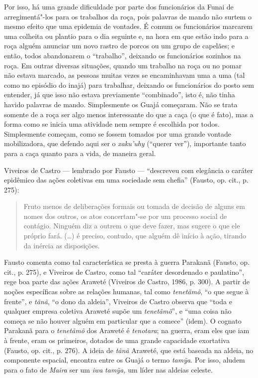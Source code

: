 Por isso, há uma grande dificuldade por parte dos funcionários da Funai
de arregimentá"-los para os trabalhos da roça, pois palavras de mando não
surtem o mesmo efeito que uma epidemia de vontades. É comum os
funcionários marcarem uma colheita ou plantio para o dia seguinte e, na
hora em que estão indo para a roça alguém anunciar um novo rastro de
porcos ou um grupo de capelães; e então, todos abandonarem o ``trabalho'',
deixando os funcionários sozinhos na roça. Em outras diversas situações,
quando um trabalho na roça ou no pomar não estava marcado, as pessoas
muitas vezes se encaminhavam uma a uma (tal como no episódio do inajá)
para trabalhar, deixando os funcionários do posto sem entender, já que
isso não estava previamente ``combinado'', isto é, não tinha havido
palavras de mando. Simplesmente os Guajá começaram. Não se trata somente
de a roça ser algo menos interessante do que a caça (o que é fato), mas
a forma como se inicia uma atividade nem sempre é escolhida por todos.
Simplesmente começam, como se fossem tomados por uma grande vontade
mobilizadora, que defendo aqui ser o \emph{xaku'uhy} (``querer ver''),
importante tanto para a caça quanto para a vida, de maneira geral.

Viveiros de Castro --- lembrado por Fausto --- ``descreveu com elegância o
caráter epidêmico das ações coletivas em uma sociedade sem chefia''
(Fausto, op. cit., p. 275):

\begin{quote}
Fruto menos de deliberações formais ou tomada de decisão de alguns em
nomes dos outros, os atos concertam"-se por um processo social de
contágio. Ninguém diz a outrem o que deve fazer, mas sugere o que ele
próprio fará. (\ldots{}) é preciso, contudo, que alguém dê início à ação,
tirando da inércia as disposições.
\end{quote}

Fausto comenta como tal característica se presta à guerra Parakanã
(Fausto, op. cit., p. 275), e Viveiros de Castro, como tal ``caráter
desordenado e paulatino'', rege boa parte das ações Araweté (Viveiros de
Castro, 1986, p. 300). A partir de noções específicas sobre as relações
humanas, tal como \emph{tenetãmõ}, ``o que segue à frente'', e
\emph{tãnã}, ``o dono da aldeia'', Viveiros de Castro observa que ``toda e
qualquer empresa coletiva Araweté supõe um \emph{tenetãmõ}'', e ``uma
coisa não começa se não houver alguém em particular que a comece''
(idem). O cognato Parakanã para o \emph{tenetãmõ} dos Araweté é
\emph{tenotara}; na guerra, eram eles que iam à frente, eram os
primeiros, dotados de uma grande capacidade exortativa (Fausto, op.
cit., p. 276). A ideia de \emph{tãnã} Araweté, que está baseada na
aldeia, no componente espacial, encontra entre os Guajá o termo
\emph{tamỹa}. Por isso, aludem para o fato de \emph{Maira} ser um
\emph{iwa} \emph{tamỹa,} um líder nas aldeias celeste.

